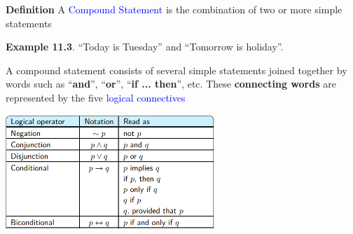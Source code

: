 \documentclass[aspectratio=169]{beamer}
\providecommand{\Blue}[1]{\textcolor{blue}{#1}}
\begin{document}
\begin{frame}[plain]{}

  {\bf Definition} A \Blue{Compound Statement}  is the combination of two or more simple statements 
   
  \medskip
  
  {\bf Example 11.3}. ``Today is Tuesday'' and ``Tomorrow is holiday''.
  \medskip
  \pause
  
  A compound statement consists of several simple statements joined together by words such 
 as ``{\bf and}'', ``{\bf or}'', ``{\bf if ... then}'', etc. 
 These {\bf connecting words} are represented by the five 
 \Blue{logical connectives} 
 \begin{center}
   \includegraphics[height=4.3cm]{./img/lecture11-fig1.png}
 \end{center}

\end{frame}
\end{document}

